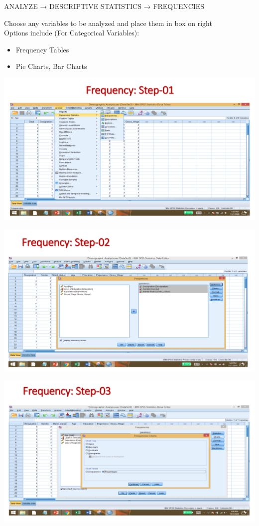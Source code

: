 \documentclass[
  letterpaper,
  DIV=11,
  numbers=noendperiod]{scrreprt}
\providecommand{\tightlist}{%
  \setlength{\itemsep}{0pt}\setlength{\parskip}{0pt}}\usepackage{longtable,booktabs,array}
\begin{document}
{ANALYZE → DESCRIPTIVE STATISTICS → FREQUENCIES}

Choose any variables to be analyzed and place them in box on right\\
Options include (For Categorical Variables):\\

\begin{itemize}
\tightlist
\item
  Frequency Tables\\
\item
  Pie Charts, Bar Charts\\
\end{itemize}

\includegraphics{images/slides/img_Page_026.png}

\includegraphics{images/slides/img_Page_027.png}

\includegraphics{images/slides/img_Page_028.png}
\end{document}
